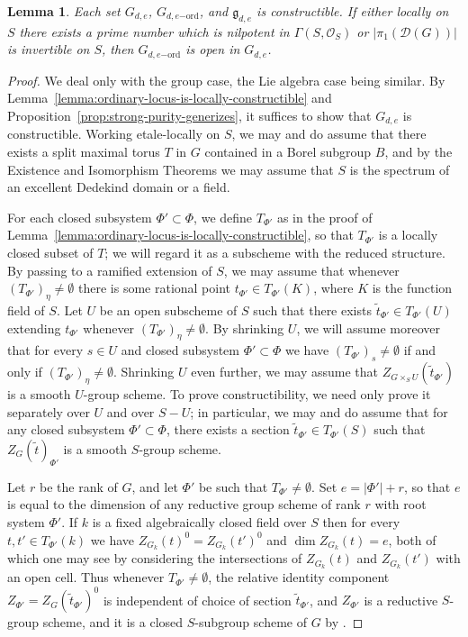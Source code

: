 \documentclass[11pt,reqno]{amsart}
\newtheorem{lemma}[theorem]{Lemma}
\theoremstyle{definition}
\renewcommand{\rm}{\mathrm}
\newcommand{\sD}{{\mathscr D}}
\newcommand{\sO}{{\mathscr O}}
\newcommand{\fg}{\mathfrak{g}}
\begin{document}
\begin{lemma}\label{lemma:locus-of-d-e-elements}
Each set $G_{d, e}$, $G_{d, e\rm{-ord}}$, and $\fg_{d, e}$ is constructible. If either locally on $S$ there exists a prime number which is nilpotent in $\Gamma(S, \sO_S)$ or $|\pi_1(\sD(G))|$ is invertible on $S$, then $G_{d,e\rm{-ord}}$ is open in $G_{d,e}$.
\end{lemma}

\begin{proof}
We deal only with the group case, the Lie algebra case being similar. By Lemma~\ref{lemma:ordinary-locus-is-locally-constructible} and Proposition~\ref{prop:strong-purity-generizes}, it suffices to show that $G_{d, e}$ is constructible. Working etale-locally on $S$, we may and do assume that there exists a split maximal torus $T$ in $G$ contained in a Borel subgroup $B$, and by the Existence and Isomorphism Theorems \cite[Thms.\ 6.1.16 and 6.1.17]{Conrad} we may assume that $S$ is the spectrum of an excellent Dedekind domain or a field. \smallskip

For each closed subsystem $\Phi' \subset \Phi$, we define $T_{\Phi'}$ as in the proof of Lemma~\ref{lemma:ordinary-locus-is-locally-constructible}, so that $T_{\Phi'}$ is a locally closed subset of $T$; we will regard it as a subscheme with the reduced structure. By passing to a ramified extension of $S$, we may assume that whenever $(T_{\Phi'})_\eta \neq \emptyset$ there is some rational point $t_{\Phi'} \in T_{\Phi'}(K)$, where $K$ is the function field of $S$. Let $U$ be an open subscheme of $S$ such that there exists $\widetilde{t}_{\Phi'} \in T_{\Phi'}(U)$ extending $t_{\Phi'}$ whenever $(T_{\Phi'})_\eta \neq \emptyset$. By shrinking $U$, we will assume moreover that for every $s \in U$ and closed subsystem $\Phi' \subset \Phi$ we have $(T_{\Phi'})_s \neq \emptyset$ if and only if $(T_{\Phi'})_\eta \neq \emptyset$. Shrinking $U$ even further, we may assume that $Z_{G \times_S U}(\widetilde{t}_{\Phi'})$ is a smooth $U$-group scheme. To prove constructibility, we need only prove it separately over $U$ and over $S - U$; in particular, we may and do assume that for any closed subsystem $\Phi' \subset \Phi$, there exists a section $\widetilde{t}_{\Phi'} \in T_{\Phi'}(S)$ such that $Z_G(\widetilde{t})_{\Phi'}$ is a smooth $S$-group scheme. \smallskip

Let $r$ be the rank of $G$, and let $\Phi'$ be such that $T_{\Phi'} \neq \emptyset$. Set $e = |\Phi'| + r$, so that $e$ is equal to the dimension of any reductive group scheme of rank $r$ with root system $\Phi'$. If $k$ is a fixed algebraically closed field over $S$ then for every $t, t' \in T_{\Phi'}(k)$ we have $Z_{G_k}(t)^0 = Z_{G_k}(t')^0$ and $\dim Z_{G_k}(t) = e$, both of which one may see by considering the intersections of $Z_{G_k}(t)$ and $Z_{G_k}(t')$ with an open cell. Thus whenever $T_{\Phi'} \neq \emptyset$, the relative identity component $Z_{\Phi'} = Z_G(\widetilde{t}_{\Phi'})^0$ is independent of choice of section $\widetilde{t}_{\Phi'}$, and $Z_{\Phi'}$ is a reductive $S$-group scheme, and it is a closed $S$-subgroup scheme of $G$ by \cite[Thm.\ 5.3.5]{Conrad}. \smallskip


\end{proof}
\end{document}
